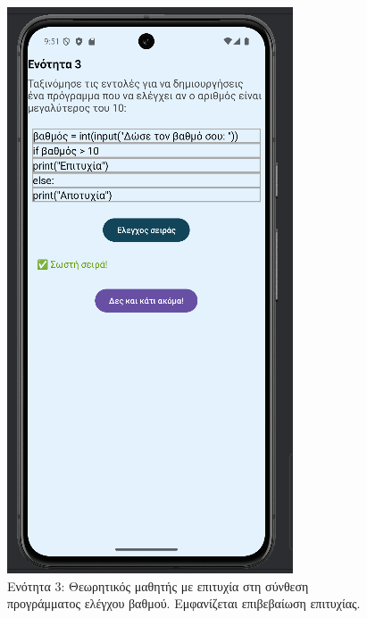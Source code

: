 \documentclass[11pt]{report}
\begin{document}
\begin{figure}[H]
  \centering
  \begin{minipage}[b]{0.45\textwidth}
    \includegraphics[width=\linewidth, height=0.35\textheight, keepaspectratio]{Figures/εικόνα (18).png}
    \caption{Ενότητα 3: Θεωρητικός μαθητής με επιτυχία στη σύνθεση προγράμματος ελέγχου βαθμού. Εμφανίζεται επιβεβαίωση επιτυχίας.}

\end{minipage}
\end{figure}
\end{document}
